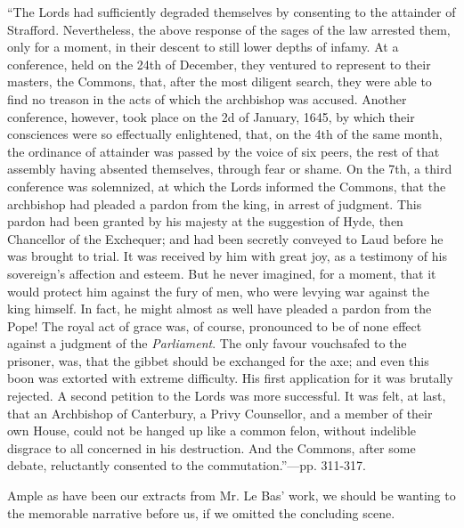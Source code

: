 ``The Lords had sufficiently degraded
themselves by consenting to the attainder of Strafford. Nevertheless,
the above response of the sages of the law arrested them, only for a
moment, in their descent to still lower depths of infamy. At a
conference, held on the 24th of December, they ventured to represent to
their masters, the Commons, that, after the most diligent search, they
were able to find no treason in the acts of which the archbishop was
accused. Another conference, however, took place on the 2d of January,
1645, by which their consciences were so effectually enlightened, that,
on the 4th of the same month, the ordinance of attainder was passed by
the voice of six peers, the rest of that assembly having absented
themselves, through fear or shame. On the 7th, a third conference was
solemnized, at which the Lords informed the Commons, that the archbishop
had pleaded a pardon from the king, in arrest of judgment. This pardon
had been granted by his majesty at the suggestion of Hyde, then
Chancellor of the Exchequer; and had been secretly conveyed to Laud
before he was brought to trial. It was received by him with great joy,
as a testimony of his sovereign's affection and esteem. But he never
imagined, for a moment, that it would protect him against the fury of
men, who were levying war against the king himself. In fact, he might
almost as well have pleaded a pardon from the Pope! The royal act of
grace was, of course, pronounced to be of none effect against a judgment
of the \emph{Parliament}. The only favour vouchsafed to the prisoner,
was, that the gibbet should be exchanged for the axe; and even this boon
was extorted with extreme difficulty. His first application for it was
brutally rejected. A second petition to the Lords was more successful.
It was felt, at last, that an Archbishop of Canterbury, a Privy
Counsellor, and a member of their own House, could not be hanged up like
a common felon, without indelible disgrace to all concerned in his
destruction. And the Commons, after some debate, reluctantly consented
to the commutation.''—pp. 311-317.

Ample as have been our extracts from Mr. Le Bas'
work, we should be wanting to the memorable narrative before us, if we
omitted the concluding scene.

